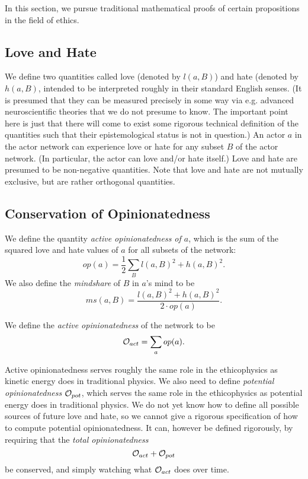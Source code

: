 \documentclass{article}
\begin{document}
In this section, we pursue traditional mathematical proofs of certain
propositions in the field of ethics.

\subsection{Love and Hate}

We define two quantities called love (denoted by $l(a, B)$) and hate
(denoted by $h(a, B)$, intended to be interpreted roughly in their
standard English senses. (It is presumed that they can be measured
precisely in some way via e.g. advanced neuroscientific theories that
we do not presume to know. The important point here is just that there
will come to exist some rigorous technical definition of the
quantities such that their epistemological status is not in
question.) An actor $a$ in the actor network can experience love or
hate for any subset $B$ of the actor network. (In particular, the
actor can love and/or hate itself.) Love and hate are presumed to be
non-negative quantities. Note that love and hate are not mutually
exclusive, but are rather orthogonal quantities.

\subsection{Conservation of Opinionatedness}

We define the quantity {\em active opinionatedness of $a$}, which is
the sum of the squared love and hate values of $a$ for all subsets of
the network:
$$op(a) = \frac{1}{2} \sum_B l(a, B)^2 + h(a, B)^2.$$ We also define the {\em mindshare} of $B$ in $a$'s mind to be
$$ms(a, B) = \frac{l(a, B)^2 + h(a, B)^2}{2 \cdot op(a)}.$$

We define the {\em active opinionatedness} of the network to be
$${\mathcal O}_{act} = \sum_a op(a).$$ 

Active opinionatedness serves roughly the same role in the
ethicophysics as kinetic energy does in traditional physics. We also
need to define {\em potential opinionatedness} ${\mathcal O}_{pot}$, which
serves the same role in the ethicophysics as potential energy does in
traditional physics. We do not yet know how to define all possible
sources of future love and hate, so we cannot give a rigorous
specification of how to compute potential opinionatedness. It can,
however be defined rigorously, by requiring that the {\em total
  opinionatedness}
$${\mathcal O}_{act} + {\mathcal O}_{pot}$$ be conserved, and simply watching what
${\mathcal O}_{act}$ does over time.
\end{document}
